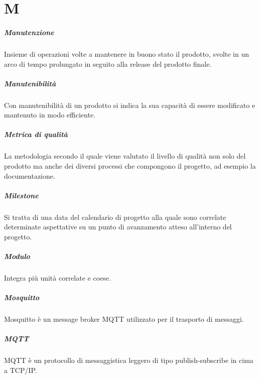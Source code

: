 \chapter{M}

\paragraph*{Manutenzione}
Insieme di operazioni volte a mantenere in buono stato il prodotto, svolte in un arco di tempo prolungato in seguito alla release del prodotto finale.

\paragraph*{Manutenibilità}
Con manutenibilità di un prodotto si indica la sua capacità di essere modificato e mantenuto in modo efficiente.

\paragraph*{Metrica di qualità}
La metodologia secondo il quale viene valutato il livello di qualità non solo del prodotto ma anche dei diversi processi che compongono il progetto, ad esempio la documentazione.

\paragraph*{Milestone}
Si tratta di una data del calendario di progetto alla quale sono correlate determinate aspettative su un punto di avanzamento atteso all'interno del progetto.

\paragraph*{Modulo}
Integra più unità correlate e coese.

\paragraph*{Mosquitto}
Mosquitto è un message broker MQTT utilizzato per il trasporto di messaggi.

\paragraph*{MQTT}
MQTT è un protocollo di messaggistica leggero di tipo publish-subscribe in cima a TCP/IP.